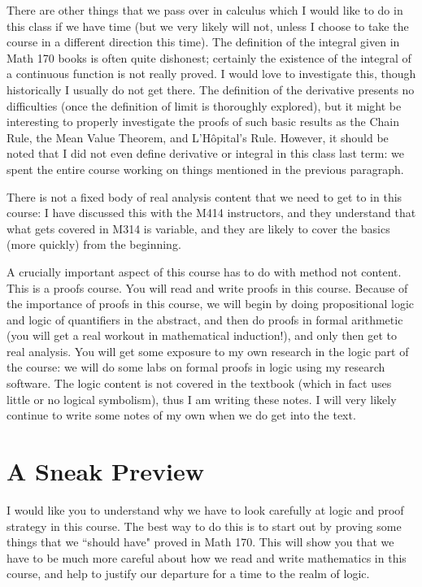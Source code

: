 \documentclass[12pt]{article}
\begin{document}
There are other things that we pass over in calculus which I would like to do in this class if we have time (but we very likely will not, unless I choose to take the course in a different direction this time).  The definition of the integral given in Math 170 books is often quite dishonest; certainly the existence of the integral of a continuous function is not really proved.  I would love to investigate this, though historically I usually do not get there.  The definition of the derivative presents no difficulties (once the definition of limit is thoroughly explored), but it might be interesting to properly investigate the proofs of such basic results
as the Chain Rule, the Mean Value Theorem, and L'H\^opital's Rule.   However, it should be noted that I did not even define
derivative or integral in this class last term:  we spent the entire course working on things mentioned in the previous paragraph.

There is not a fixed body of real analysis content that we need to get to in this course:  I have discussed this with the M414 instructors, and they understand that what gets covered in M314 is variable, and they are likely to cover the basics (more quickly) from the beginning.

A crucially important aspect of this course has to do with method not content.  This is a proofs course.  You will read and write proofs in this course.  Because of the importance of proofs in this course, we will begin by doing propositional logic and logic of quantifiers in the abstract, and then do proofs in formal arithmetic (you will get a real workout in mathematical induction!), and only then get to real analysis.  You will get some exposure to my own research in the logic part of the course:  we will do some labs on formal proofs in logic using my research software.  The logic content is not covered in the textbook (which in fact uses little or no logical symbolism), thus I am writing these notes.  I will very likely continue to write some notes of my own when we do get into the text.

\section{A Sneak Preview}

I would like you to understand why we have to look carefully at logic and proof strategy in this course.  The best way to do this is to start out by proving some things that we ``should have" proved in Math 170.  This will show you that we have to be much more careful about how we read and write mathematics in this course, and help to justify our departure for a time to the realm of logic.
\end{document}
